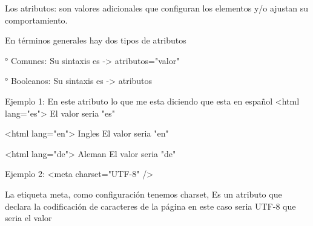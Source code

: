 Los atributos: son valores adicionales que configuran los elementos y/o ajustan su comportamiento.

En términos generales hay dos tipos de atributos


° Comunes: 
Su sintaxis es -> atributos="valor"


° Booleanos:
Su sintaxis es -> atributos 


Ejemplo 1:
En este atributo lo que me esta diciendo que esta en español <html lang="es">
El valor seria "es"


<html lang="en"> Ingles 
El valor seria "en"


<html lang="de"> Aleman
El valor seria "de"


Ejemplo 2:
<meta charset="UTF-8" />

La etiqueta meta, como configuración tenemos charset, Es un atributo que declara la codificación de caracteres de la página en este caso seria UTF-8 que seria el valor

